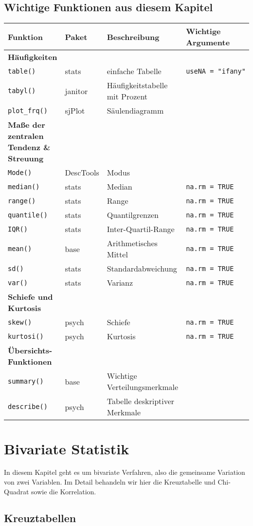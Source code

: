 \documentclass[
]{book}
\begin{document}
\hypertarget{wichtige-funktionen-aus-diesem-kapitel-2}{%
\section*{Wichtige Funktionen aus diesem Kapitel}\label{wichtige-funktionen-aus-diesem-kapitel-2}}

\begin{longtable}[]{@{}llll@{}}
\toprule
Funktion & Paket & Beschreibung & Wichtige Argumente\tabularnewline
\midrule
\endhead
\textbf{Häufigkeiten} & & &\tabularnewline
\texttt{table()} & stats & einfache Tabelle & \texttt{useNA\ =\ "ifany"}\tabularnewline
\texttt{tabyl()} & janitor & Häufigkeitstabelle mit Prozent &\tabularnewline
\texttt{plot\_frq()} & sjPlot & Säulendiagramm &\tabularnewline
\textbf{Maße der zentralen Tendenz \& Streuung} & & &\tabularnewline
\texttt{Mode()} & DescTools & Modus &\tabularnewline
\texttt{median()} & stats & Median & \texttt{na.rm\ =\ TRUE}\tabularnewline
\texttt{range()} & stats & Range & \texttt{na.rm\ =\ TRUE}\tabularnewline
\texttt{quantile()} & stats & Quantilgrenzen & \texttt{na.rm\ =\ TRUE}\tabularnewline
\texttt{IQR()} & stats & Inter-Quartil-Range & \texttt{na.rm\ =\ TRUE}\tabularnewline
\texttt{mean()} & base & Arithmetisches Mittel & \texttt{na.rm\ =\ TRUE}\tabularnewline
\texttt{sd()} & stats & Standardabweichung & \texttt{na.rm\ =\ TRUE}\tabularnewline
\texttt{var()} & stats & Varianz & \texttt{na.rm\ =\ TRUE}\tabularnewline
\textbf{Schiefe und Kurtosis} & & &\tabularnewline
\texttt{skew()} & psych & Schiefe & \texttt{na.rm\ =\ TRUE}\tabularnewline
\texttt{kurtosi()} & psych & Kurtosis & \texttt{na.rm\ =\ TRUE}\tabularnewline
\textbf{Übersichts-Funktionen} & & &\tabularnewline
\texttt{summary()} & base & Wichtige Verteilungsmerkmale &\tabularnewline
\texttt{describe()} & psych & Tabelle deskriptiver Merkmale &\tabularnewline
\bottomrule
\end{longtable}

\hypertarget{bivariate-statistik}{%
\chapter{Bivariate Statistik}\label{bivariate-statistik}}

In diesem Kapitel geht es um bivariate Verfahren, also die gemeinsame Variation von zwei Variablen. Im Detail behandeln wir hier die Kreuztabelle und Chi-Quadrat sowie die Korrelation.

\hypertarget{kreuztabellen}{%
\section{Kreuztabellen}\label{kreuztabellen}}
\end{document}
